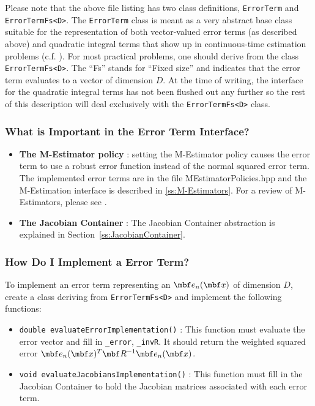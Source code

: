 \documentclass[11pt,a4,oneside]{article}
\newcommand{\txt}[1]{{\footnotesize\texttt{#1}}}
\begin{document}
Please note that the above file listing has two class definitions, \txt{ErrorTerm} and \txt{ErrorTermFs<D>}. The \txt{ErrorTerm} class is meant as a very abstract base class suitable for the representation of both vector-valued error terms (as described above) and quadratic integral terms that show up in continuous-time estimation problems (c.f. \citet{Tong1200,Furgale1200}). For most practical problems, one should derive from the class \txt{ErrorTermFs<D>}. The ``Fs'' stands for ``Fixed size'' and indicates that the error term evaluates to a vector of dimension $D$. At the time of writing, the interface for the quadratic integral terms has not been flushed out any further so the rest of this description will deal exclusively with the \txt{ErrorTermFs<D>} class. 

\subsubsection{What is Important in the Error Term Interface?}
\begin{itemize}
\item {\bf The M-Estimator policy} : setting the M-Estimator policy causes the error term to use a robust error function instead of the normal squared error term. The implemented error terms are in the file {MEstimatorPolicies.hpp} and the M-Estimation interface is described in \ref{ss:M-Estimators}. For a review of M-Estimators, please see \citet{Zhang9700}.
\item {\bf The Jacobian Container} : The Jacobian Container abstraction is explained in Section~\ref{ss:JacobianContainer}.
\end{itemize}

\subsubsection{How Do I Implement a Error Term?}
To implement an error term representing an $\mbf e_n(\mbf x)$ of dimension $D$, create a class deriving from \txt{ErrorTermFs<D>} and implement the following functions:
\begin{itemize}
\item \txt{double evaluateErrorImplementation()} : This function must evaluate the error vector and fill in \txt{\_error}, \txt{\_invR}. It should return the weighted squared error $\mbf e_n(\mbf x)^T \mbf R^{-1} \mbf e_n(\mbf x)$.
\item \txt{void evaluateJacobiansImplementation()} : This function must fill in the Jacobian Container to hold the Jacobian matrices associated with each error term.
\end{itemize}
\end{document}

